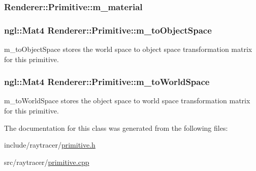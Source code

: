 \subsubsection[{m\+\_\+material}]{ Renderer\+::\+Primitive\+::m\+\_\+material\hspace{0.3cm}{\ttfamily [protected]}}\label{classRenderer_1_1Primitive_a3c5f1dc45cf1c74402047a93007d9a3b}
\hypertarget{classRenderer_1_1Primitive_a14b4a25d610a4af486935efff6d85a3c}{}
\subsubsection[{m\+\_\+to\+Object\+Space}]{\setlength{\rightskip}{0pt plus 5cm}ngl\+::\+Mat4 Renderer\+::\+Primitive\+::m\+\_\+to\+Object\+Space\hspace{0.3cm}{\ttfamily [protected]}}\label{classRenderer_1_1Primitive_a14b4a25d610a4af486935efff6d85a3c}


m\+\_\+to\+Object\+Space stores the world space to object space transformation matrix for this primitive. 

\hypertarget{classRenderer_1_1Primitive_a165cf73028170dd26e253a35ca3f75e4}{}
\subsubsection[{m\+\_\+to\+World\+Space}]{\setlength{\rightskip}{0pt plus 5cm}ngl\+::\+Mat4 Renderer\+::\+Primitive\+::m\+\_\+to\+World\+Space\hspace{0.3cm}{\ttfamily [protected]}}\label{classRenderer_1_1Primitive_a165cf73028170dd26e253a35ca3f75e4}


m\+\_\+to\+World\+Space stores the object space to world space transformation matrix for this primitive. 



The documentation for this class was generated from the following files\+:\begin{DoxyCompactItemize}
\item 
include/raytracer/\hyperlink{primitive_8h}{primitive.\+h}\item 
src/raytracer/\hyperlink{primitive_8cpp}{primitive.\+cpp}\end{DoxyCompactItemize}

